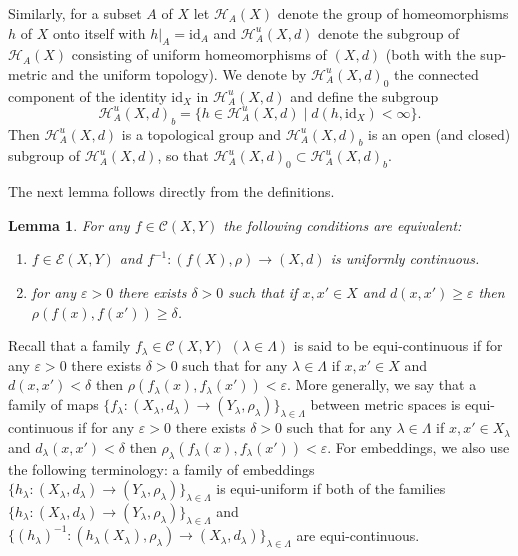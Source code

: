 \documentclass[11pt, fleqn]{amsart}
\newtheorem{lemma}{Lemma}[section]
\theoremstyle{definition}
\newcommand{\cal}{\mathcal}
\newcommand{\e}{\varepsilon}
\newcommand{\id}{\mathrm{id}}
\newcommand{\E}{\mathcal E}
\begin{document}
Similarly, for a subset $A$ of $X$ 
let ${\cal H}_A(X)$ denote the group of homeomorphisms $h$ of $X$ onto itself with $h|_A = \id_A$ 
and ${\cal H}^u_A(X, d)$ denote the subgroup of ${\cal H}_A(X)$ consisting of uniform homeomorphisms of $(X, d)$ 
 (both with the sup-metric and the uniform topology). 
We denote by ${\cal H}^u_A(X, d)_0$ the connected component of the identity $\id_X$ in ${\cal H}^u_A(X, d)$ and define 
the subgroup 
$${\cal H}^u_A(X, d)_b = \{ h \in {\cal H}^u_A(X, d) \mid d(h, \id_X) < \infty \}.$$ 
Then ${\cal H}^u_A(X, d)$ is a topological group and ${\cal H}^u_A(X, d)_b$ is an open (and closed) subgroup of ${\cal H}^u_A(X, d)$, so that 
${\cal H}^u_A(X, d)_0 \subset {\cal H}^u_A(X, d)_b$. 

The next lemma follows directly from the definitions. 

\begin{lemma}\label{lemma_unif-emb} 
For any $f \in {\cal C}(X, Y)$ the following conditions are equivalent: 
\begin{enumerate}
\item $f \in \E(X, Y)$ and $f^{-1} : (f(X), \rho) \to (X, d)$ is uniformly continuous. 
\item for any $\e > 0$ there exists $\delta > 0$ such that if $x, x' \in X$ and $d(x, x') \geq \e$ then $\rho(f(x), f(x')) \geq \delta$. 
\end{enumerate}
\end{lemma}

Recall that a family $f_\lambda \in {\cal C}(X, Y)$ $(\lambda \in \Lambda)$ is said to be equi-continuous if 
for any $\e > 0$ there exists $\delta > 0$ such that for any $\lambda \in \Lambda$ 
if $x, x' \in X$ and $d(x,x')< \delta$ then $\rho(f_\lambda(x), f_\lambda(x')) < \e$. 
More generally, we say that a family of maps $\{ f_\lambda : (X_\lambda, d_\lambda) \to (Y_\lambda, \rho_\lambda) \}_{\lambda \in \Lambda}$ between metric spaces is equi-continuous if 
for any $\e > 0$ there exists $\delta > 0$ such that for any $\lambda \in \Lambda$ 
if $x, x' \in X_\lambda$ and $d_\lambda(x,x')< \delta$ then $\rho_\lambda(f_\lambda(x), f_\lambda(x')) < \e$. 
For embeddings, we also use the following terminology: a family of embeddings 
$\{ h_\lambda : (X_\lambda, d_\lambda) \to (Y_\lambda, \rho_\lambda)\}_{\lambda \in \Lambda}$ is equi-uniform 
if both of the families $\{ h_\lambda : (X_\lambda, d_\lambda) \to (Y_\lambda, \rho_\lambda)\}_{\lambda \in \Lambda}$ and $\{(h_\lambda)^{-1} : (h_\lambda(X_\lambda), \rho_\lambda) \to (X_\lambda, d_\lambda)\}_{\lambda \in \Lambda}$ are equi-continuous. 
\end{document}
